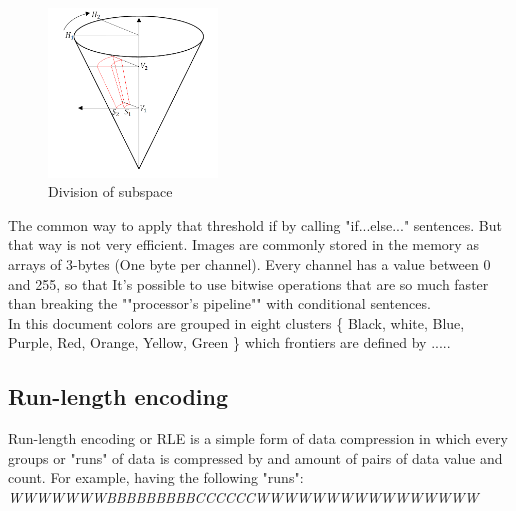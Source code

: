 \begin{figure}
	\vspace{-2.5cm}
	\includegraphics[width=0.4\textwidth,natwidth=659,natheight=659]{../Images/c1/DividingSubSpace.png}
	\caption{Division of subspace}
	\label{fig:DividingSubSpace}
\end{figure}

The common way to apply that threshold if by calling "if...else..." sentences. But that way is not very efficient. Images are commonly stored in the memory as arrays of 3-bytes (One byte per channel). Every channel has a value between 0 and 255, so that It's possible to use bitwise operations \cite{JamesBruce} that are so much faster than breaking the ""processor's pipeline"" with conditional sentences. \\


In this document colors are grouped in eight clusters \{ Black, white, Blue, Purple, Red, Orange, Yellow, Green \} which frontiers are defined by ..... %


\subsection{Run-length encoding}
Run-length encoding or RLE is a simple form of data compression in which every groups or "runs" of data is compressed by and amount of pairs of data value and count. For example, having the following "runs": \\

\textit{WWWWWWWBBBBBBBBBCCCCCCWWWWWWWWWWWWWWWW} \\

